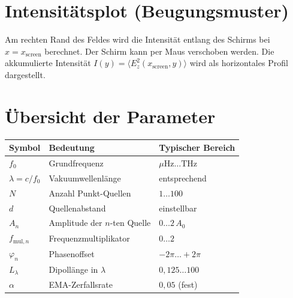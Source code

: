 \documentclass[11pt,a4paper]{article}
\begin{document}
\section{Intensitätsplot (Beugungsmuster)}

Am rechten Rand des Feldes wird die Intensität entlang des Schirms bei
$x = x_{\text{screen}}$ berechnet.  Der Schirm kann per Maus verschoben werden.
Die akkumulierte Intensität $I(y) = \langle E_z^2(x_{\text{screen}}, y)\rangle$
wird als horizontales Profil dargestellt.

\section{Übersicht der Parameter}

\begin{center}
\begin{tabular}{lll}
\toprule
Symbol & Bedeutung & Typischer Bereich \\
\midrule
$f_0$ & Grundfrequenz & $\mu\text{Hz} \ldots \text{THz}$ \\
$\lambda = c/f_0$ & Vakuumwellenlänge & entsprechend \\
$N$ & Anzahl Punkt-Quellen & $1 \ldots 100$ \\
$d$ & Quellenabstand & einstellbar \\
$A_n$ & Amplitude der $n$-ten Quelle & $0 \ldots 2\,A_0$ \\
$f_{\text{mul},n}$ & Frequenzmultiplikator & $0 \ldots 2$ \\
$\varphi_n$ & Phasenoffset & $-2\pi \ldots +2\pi$ \\
$L_\lambda$ & Dipollänge in $\lambda$ & $0{,}125 \ldots 100$ \\
$\alpha$ & EMA-Zerfallsrate & $0{,}05$ (fest) \\
\bottomrule
\end{tabular}
\end{center}
\end{document}
